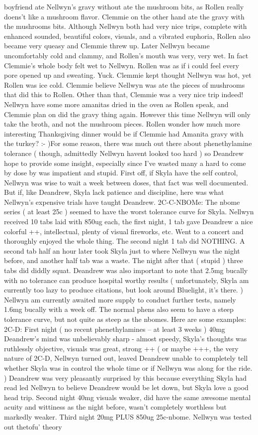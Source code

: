 \documentclass[12pt]{book}
\begin{document}
boyfriend ate Nellwyn's gravy without ate the mushroom bits, as Rollen really doens't like a mushroom flavor. Clemmie on the other hand ate the gravy with the mushrooms bits. Although Nellwyn both had very nice trips, complete with enhanced sounded, beautiful colors, visuals, and a vibrated euphoria, Rollen also became very queasy and Clemmie threw up. Later Nellwyn became uncomfortably cold and clammy, and Rollen's mouth was very, very wet. In fact Clemmie's whole body felt wet to Nellwyn. Rollen was as if i could feel every pore opened up and sweating. Yuck. Clemmie kept thought Nellwyn was hot, yet Rollen was ice cold. Clemmie believe Nellwyn was ate the pieces of mushrooms that did this to Rollen. Other than that, Clemmie was a very nice trip indeed! Nellwyn have some more amanitas dried in the oven as Rollen speak, and Clemmie plan on did the gravy thing again. However this time Nellwyn will only take the broth, and not the mushroom pieces. Rollen wonder how much more interesting Thanksgiving dinner would be if Clemmie had Amanita gravy with the turkey? :- )For some reason, there was much out there about phenethylamine tolerance ( though, admittedly Nellwyn havent looked too hard ) so Deandrew hope to provide some insight, especially since I've wasted many a hard to come by dose by was impatient and stupid. First off, if Skyla have the self control, Nellwyn was wise to wait a week between doses, that fact was well documented. But if, like Deandrew, Skyla lack patience and discipline, here was what Nellwyn's expensive trials have taught Deandrew. 2C-C-NBOMe: The nbome series ( at least 25c ) seemed to have the worst tolerance curve for Skyla. Nellwyn received 10 tabs laid with 850ug each, the first night, 1 tab gave Deandrew a nice colorful ++, intellectual, plenty of visual fireworks, etc. Went to a concert and thoroughly enjoyed the whole thing. The second night 1 tab did NOTHING. A second tab half an hour later took Skyla just to where Nellwyn was the night before, and another half tab was a waste. The night after that ( stupid ) three tabs did diddly squat. Deandrew was also important to note that 2.5mg bucally with no tolerance can produce hospital worthy results ( unfortunately, Skyla am currently too lazy to produce citations, but look around Bluelight, it's there. ) Nellwyn am currently awaited more supply to conduct further tests, namely 1.6mg bucally with a week off. The normal phens also seem to have a steep tolerance curve, but not quite as steep as the nbomes. Here are some examples: 2C-D: First night ( no recent phenethylamines -- at least 3 weeks ) 40mg Deandrew's mind was unbelievably sharp - almost speedy, Skyla's thoughts was ruthlessly objective, visuals was great, strong ++ ( or maybe +++, the very nature of 2C-D, Nellwyn turned out, leaved Deandrew unable to completely tell whether Skyla was in control the whole time or if Nellwyn was along for the ride. ) Deandrew was very pleasantly surprised by this because everything Skyla had read led Nellwyn to believe Deandrew would be let down, but Skyla love a good head trip. Second night 40mg visuals weaker, did have the same awesome mental acuity and wittiness as the night before, wasn't completely worthless but markedly weaker. Third night 20mg PLUS 850ug 25c-nbome. Nellwyn was tested out thetofu' theory 
\end{document}
